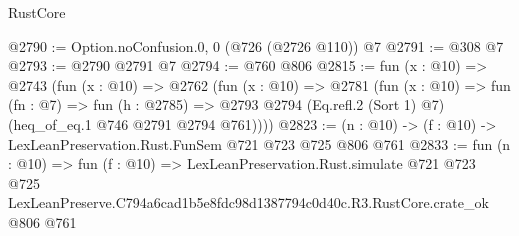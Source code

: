 \begin{lexlean}{RustCore}
\begin{coremodule}
@2790 := Option.noConfusion.{0, 0} (@726 (@2726 @110)) @7
@2791 := @308 @7
@2793 := @2790 @2791 @7
@2794 := @760 @806
@2815 := fun (x : @10) =>
  @2743
    (fun (x : @10) =>
    @2762
      (fun (x : @10) =>
      @2781
        (fun (x : @10) =>
        fun (fn : @7) =>
        fun (h : @2785) =>
        @2793 @2794 (Eq.refl.{2} (Sort 1) @7) (heq_of_eq.{1} @746 @2791 @2794 @761))))
@2823 := (n : @10) -> (f : @10) -> LexLeanPreservation.Rust.FunSem @721 @723 @725 @806 @761
@2833 := fun (n : @10) =>
  fun (f : @10) =>
  LexLeanPreservation.Rust.simulate
    @721
    @723
    @725
    LexLeanPreserve.C794a6cad1b5e8fdc98d1387794c0d40c.R3.RustCore.crate_ok
    @806
    @761
\end{coremodule}
\end{lexlean}
